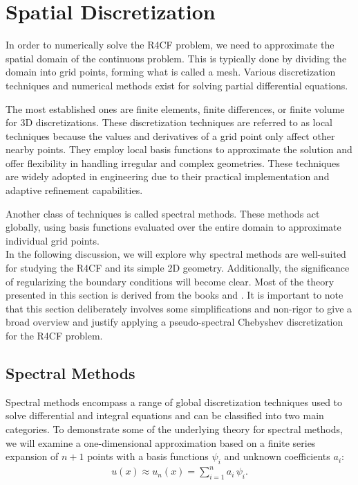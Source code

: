 
\section{Spatial Discretization} \label{sec:spectral}

In order to numerically solve the R4CF problem, we need to approximate the
spatial domain of the continuous problem. This is typically done by dividing
the domain into grid points, forming what is called a mesh. Various
discretization techniques and numerical methods exist for solving partial
differential equations.

The most established ones are finite elements, finite differences, or finite
volume for 3D discretizations. These discretization techniques are referred to
as local techniques because the values and derivatives of a grid point only
affect other nearby points. They employ local basis functions to approximate
the solution and offer flexibility in handling irregular and complex
geometries. These techniques are widely adopted in engineering due to their
practical implementation and adaptive refinement capabilities.

Another class of techniques is called spectral methods. These methods act
globally, using basis functions evaluated over the entire domain to approximate
individual grid points. \\

In the following discussion, we will explore why spectral methods are
well-suited for studying the R4CF and its simple 2D geometry. Additionally, the
significance of regularizing the boundary conditions will become clear. Most of
the theory presented in this section is derived from the books \citet{boyd2001}
and \citet{canuto2006}. It is important to note that this section deliberately
involves some simplifications and non-rigor to give a broad overview and
justify applying a pseudo-spectral Chebyshev discretization for the R4CF
problem.

\subsection{Spectral Methods}

Spectral methods encompass a range of global discretization techniques used to
solve differential and integral equations and can be classified into two main
categories. To demonstrate some of the underlying theory for spectral methods,
we will examine a one-dimensional approximation based on a finite series
expansion of $n+1$ points with a basis functions $\psi_i$ and unknown
coefficients $a_i$:
\begin{align}
u(x) \approx u_n(x) = \sum_{i=1}^{n} a_i \, \psi_i. 
\label{eq:approx}
\end{align}

